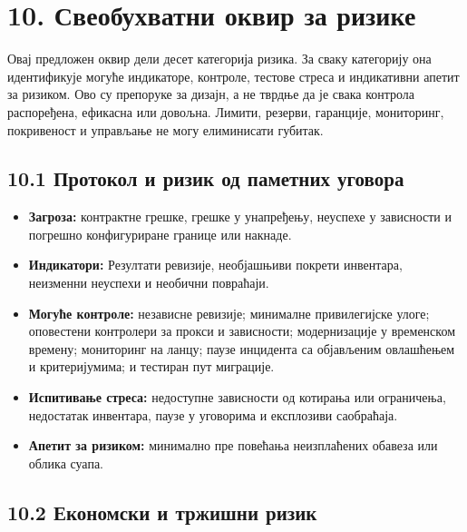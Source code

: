 \documentclass[11pt]{article}
\begin{document}
\section*{10. Свеобухватни оквир за ризике}

Овај предложен оквир дели десет категорија ризика. За сваку категорију она идентификује могуће индикаторе, контроле, тестове стреса и индикативни апетит за ризиком. Ово су препоруке за дизајн, а не тврдње да је свака контрола распоређена, ефикасна или довољна. Лимити, резерви, гаранције, мониторинг, покривеност и управљање не могу елиминисати губитак.

\subsection*{10.1 Протокол и ризик од паметних уговора}

\begin{itemize}[leftmargin=*]
\item \textbf{Загроза:} контрактне грешке, грешке у унапређењу, неуспехе у зависности и погрешно конфигуриране границе или накнаде.
\item \textbf{Индикатори:} Резултати ревизије, необјашњиви покрети инвентара, неизменни неуспехи и необични повраћаји.
\item \textbf{Могуће контроле:} независне ревизије; минималне привилегијске улоге; оповестени контролери за прокси и зависности; модернизације у временском времену; мониторинг на ланцу; паузе инцидента са објављеним овлашћењем и критеријумима; и тестиран пут миграције.
\item \textbf{Испитивање стреса:} недоступне зависности од котирања или ограничења, недостатак инвентара, паузе у уговорима и експлозиви саобраћаја.
\item \textbf{Апетит за ризиком:} минимално пре повећања неизплаћених обавеза или облика суапа.
\end{itemize}
\subsection*{10.2 Економски и тржишни ризик}
\end{document}
